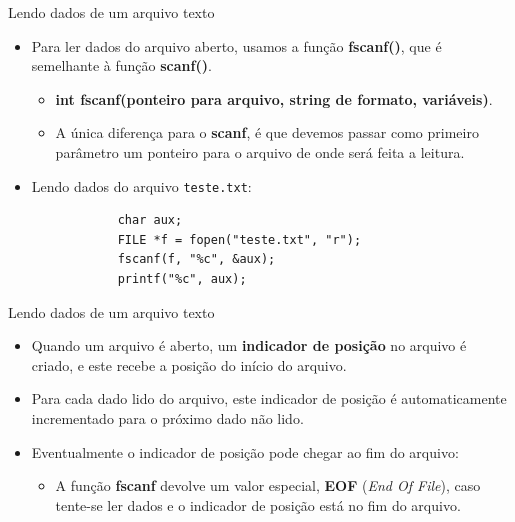 \documentclass[handout]{beamer}
\begin{document}
\begin{frame}[fragile]{Lendo dados de um arquivo texto}

    \begin{itemize}

        \item Para ler dados do arquivo aberto, usamos a função \textbf{fscanf()}, que é
        semelhante à função \textbf{scanf()}.
        \begin{itemize}
            \item \textbf{int fscanf(ponteiro para arquivo, string de formato, variáveis)}.
            \item A única diferença para o \textbf{scanf}, é que devemos passar como primeiro parâmetro
            um ponteiro para o arquivo de onde será feita a leitura.
        \end{itemize}

        \item Lendo dados do arquivo \texttt{teste.txt}:
        \begin{verbatim}
            char aux;
            FILE *f = fopen("teste.txt", "r");
            fscanf(f, "%c", &aux);
            printf("%c", aux);
        \end{verbatim}
    \end{itemize}

\end{frame}

\begin{frame}[fragile]{Lendo dados de um arquivo texto}

    \begin{itemize}
        \item Quando um arquivo é aberto, um \textbf{indicador de posição} no arquivo é criado, e este
        recebe a posição do início do arquivo.
        \item Para cada dado lido do arquivo, este indicador de posição é automaticamente incrementado
        para o próximo dado não lido.
        \item Eventualmente o indicador de posição pode chegar ao fim do arquivo:
        \begin{itemize}
            \item A função \textbf{fscanf} devolve um valor especial, \textbf{EOF} ({\it End Of File}), caso tente-se
            ler dados e o indicador de posição está no fim do arquivo.
        \end{itemize}
    \end{itemize}

\end{frame}
\end{document}
